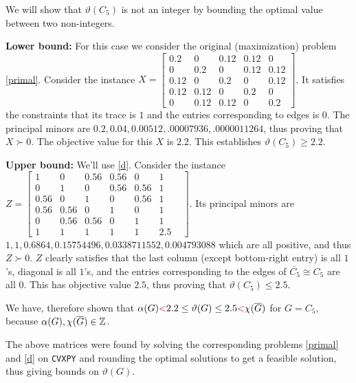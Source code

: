 \begin{enumerate}[leftmargin=*]
We will show that $\vartheta(C_{5})$ is not an integer by bounding the optimal value between two non-integers.

\textbf{Lower bound:} For this case we consider the original (maximization) problem \ref{primal}. Consider the instance $X = \begin{bmatrix}
0.2&  0&   0.12& 0.12& 0  \\
0&   0.2&  0 &  0.12& 0.12\\
0.12& 0&   0.2 & 0  & 0.12\\
0.12& 0.12& 0&   0.2 & 0  \\
0&   0.12& 0.12& 0&   0.2 
\end{bmatrix}$. It satisfies the constraints that its trace is $1$ and the entries corresponding to edges is $0$. The principal minors are $0.2, 0.04, 0.00512, .00007936, .0000011264$, thus proving that $X\succ 0$. The objective value for this $X$ is $2.2$. This establishes $\vartheta(C_{5}) \ge 2.2$.

\textbf{Upper bound:} We'll use \ref{d}. Consider the instance $Z = \begin{bmatrix}1   &0&  0.56 &0.56& 0&   1& \\
0&   1&   0 &  0.56& 0.56 &1\\
0.56& 0 &  1 &  0  & 0.56& 1\\
0.56& 0.56& 0 &  1&   0  & 1\\
0 &0.56 &0.56 &0&   1 &  1\\
1  & 1 &  1 &  1  & 1 &  2.5 \end{bmatrix}$. Its principal minors are $1,1,0.6864,0.15754496, 0.0338711552, 0.004793088$ which are all positive, and thus $Z\succ 0$. $Z$ clearly satisfies that the last column (except bottom-right entry) is all $1$'s, diagonal is all $1$'s, and the entries corresponding to the edges of $\overline{C_{5}}\cong C_{5}$ are all $0$. This has objective value $2.5$, thus proving that $\vartheta(C_{5})\le 2.5$.

We have, therefore shown that $\alpha(G) { \color{red}< } 2.2 \le \vartheta(G) \le 2.5 {\color{red}<} \chi(\overline{G})$ for $G=C_{5}$, because $\alpha(G), \chi(\overline G)\in \mathbb{Z}$.

\vspace{1in}
The above matrices were found by solving the corresponding problems \ref{primal} and \ref{d} on \texttt{CVXPY} and rounding the optimal solutions to get a feasible solution, thus giving bounds on $\vartheta(G)$.
\end{enumerate}


